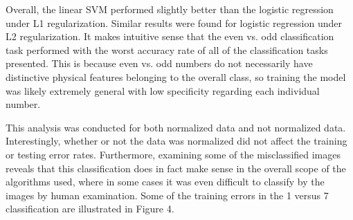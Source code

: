\documentclass{article}
\begin{document}
Overall, the linear SVM performed slightly better than the logistic regression under L1 regularization. Similar results were found for logistic regression under L2 regularization. It makes intuitive sense that the even vs. odd classification task performed with the worst accuracy rate of all of the classification tasks presented. This is because even vs. odd numbers do not necessarily have distinctive physical features belonging to the overall class, so training the model was likely extremely general with low specificity regarding each individual number.

This analysis was conducted for both normalized data and not normalized data. Interestingly, whether or not the data was normalized did not affect the training or testing error rates. Furthermore, examining some of the misclassified images reveals that this classification does in fact make sense in the overall scope of the algorithms used, where in some cases it was even difficult to classify by the images by human examination. Some of the training errors in the 1 versus 7 classification are illustrated in Figure 4.
\end{document}
